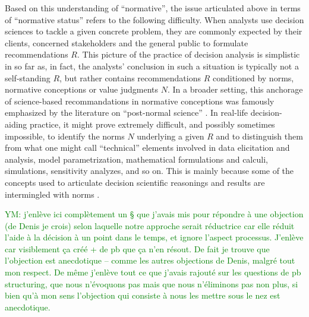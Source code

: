 \documentclass[preprint, french, english, 11pt, authoryear]{elsarticle}%
\newcommand{\commentYM}[1]{\textcolor{green}{YM: #1}}
\begin{document}
Based on this understanding of “normative”, the issue articulated above in terms of “normative status” refers to the following difficulty. When analysts use decision sciences to tackle a given concrete problem, they are commonly expected by their clients, concerned stakeholders and the general public to formulate recommendations $R$. %
This picture of the practice of decision analysis is simplistic in so far as, in fact, the analysts' conclusion in such a situation is typically not a self-standing $R$, but rather contains recommendations $R$ conditioned by norms, normative conceptions or value judgments $N$. In a broader setting, this anchorage of science-based recommandations in normative conceptions was famously emphasized by the literature on ``post-normal science'' \citep{funtowicz_science_1995}. In real-life decision-aiding practice, it might prove extremely difficult, and possibly sometimes impossible, to identify the norms $N$ underlying a given $R$ and to distinguish them from what one might call ``technical'' elements involved in data elicitation and analysis, model parametrization, mathematical formulations and calculi, simulations, sensitivity analyzes, and so on. This is mainly because some of the concepts used to articulate decision scientific reasonings and results are intermingled with norms \citep{mongin_value_2006, baujard_value_2013}.

\commentYM{j'enlève ici complètement un § que j'avais mis pour répondre à une objection (de Denis je crois) selon laquelle notre approche serait réductrice car elle réduit l'aide à la décision à un point dans le temps, et ignore l'aspect processus. J'enlève car visiblement ça créé + de pb que ça n'en résout. De fait je trouve que l'objection est anecdotique -- comme les autres objections de Denis, malgré tout mon respect. De même j'enlève tout ce que j'avais rajouté sur les questions de pb structuring, que nous n'évoquons pas mais que nous n'éliminons pas non plus, si bien qu'à mon sens l'objection qui consiste à nous les mettre sous le nez est anecdotique.}
\end{document}
